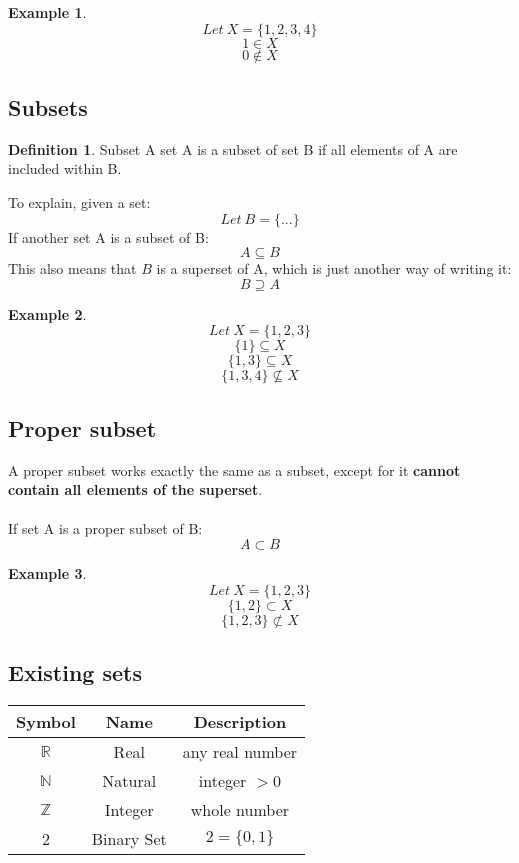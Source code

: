 \documentclass{article}
\theoremstyle{definition}
\newtheorem{df}{Definition}[section]
\newtheorem{ex}{Example}[section]
\begin{document}
\begin{ex}
	\[ Let\ X = \{1,2,3,4\}\]
	\[ 1 \in X\]
	\[0 \notin X\]
\end{ex}

\subsection{Subsets}
\begin{df}{Subset}
	A set A is a subset of set B if all elements of A are included within B.
\end{df}

To explain, given a set:
\[Let\ B = \{...\}\]
If another set A is a subset of B:
\[A \subseteq B\]
This also means that $B$ is a superset of A, which is just another way of writing it:
\[B \supseteq A\]

\begin{ex}
\[Let\ X = \{1,2,3\}\]
\[\{1\} \subseteq X\]
\[\{1,3\} \subseteq X\]
\[\{1,3,4\} \not\subseteq X\]
\end{ex}

\subsection{Proper subset}
A proper subset works exactly the same as a subset, except for it \textbf{cannot contain all elements of the superset}. \\
\\
If set A is a proper subset of B:
\[A \subset B\]

\begin{ex}
	\[Let\ X = \{1,2,3\}\]
	\[\{1,2\} \subset X\]
	\[\{1,2,3\} \not\subset X\]
\end{ex}

\subsection{Existing sets}
\begin{table}[h!]
	\centering
	\begin{tabular}{|c|c|c|}
		\hline
		Symbol & Name & Description \\
		\hline
		$\mathbb{R}$ & Real & any real number \\
		$\mathbb{N}$ & Natural & integer $> 0$ \\
		$\mathbb{Z}$ & Integer & whole number\\
		2 & Binary Set & $2 = \{0,1\}$ \\
		\hline
	\end{tabular}
\end{table}
\end{document}
